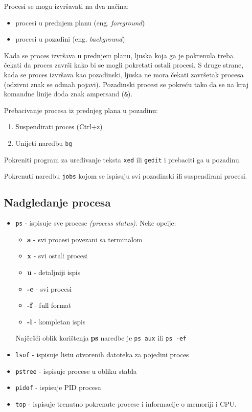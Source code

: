 Procesi se mogu izvršavati na dva načina:
\begin{itemize}
	\item procesi u prednjem planu (eng. \textit{foreground})
	\item procesi u pozadini (eng. \textit{background})
\end{itemize}
Kada se proces izvršava u prednjem planu, ljuska koja ga je pokrenula treba čekati da proces završi kako bi se mogli pokretati ostali procesi. S druge strane, kada se proces izvršava kao pozadinski, ljuska ne mora čekati završetak procesa (odzivni znak se odmah pojavi). Pozadinski procesi se pokreću tako da se na kraj komandne linije doda znak ampersand (\texttt{\&}).

Prebacivanje procesa iz prednjeg plana u pozadinu:
\begin{enumerate}
 \item Suspendirati proces (Ctrl+z)
 \item Unijeti naredbu \texttt{bg}
\end{enumerate}

\begin{zadatak}
	Pokreniti program za uređivanje teksta \texttt{xed} ili \texttt{gedit} i prebaciti ga u pozadinu.
\end{zadatak}

\begin{zadatak}
	Pokrenuti naredbu \texttt{jobs} kojom se ispisuju svi pozadinski ili suspendirani procesi.
\end{zadatak}

\subsection*{Nadgledanje procesa}
\begin{itemize}
 \item \texttt{ps} - ispisuje sve procese \textit{(process status)}. Neke opcije: 
\begin{itemize}
 \item \textbf{a} - svi procesi povezani sa terminalom
 \item \textbf{x} - svi ostali procesi
 \item \textbf{u} - detaljniji ispis
 \item \textbf{-e} - svi procesi
 \item \textbf{-f} - full format
 \item \textbf{-l} - kompletan ispis
\end{itemize}
Najčešći oblik korištenja \textbf{ps} naredbe je \texttt{ps aux} ili \texttt{ps -ef}

 \item \texttt{lsof} - ispisuje listu otvorenih datoteka za pojedini proces
\item \texttt{pstree} - ispisuje procese u obliku stabla 
\item \texttt{pidof} - ispisuje PID procesa
\item \texttt{top} - ispisuje trenutno pokrenute procese i informacije o memoriji i CPU.
\end{itemize}

